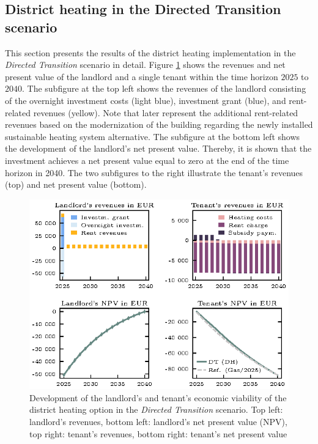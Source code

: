 \subsection{District heating in the Directed Transition scenario}\label{res:district_heating}
This section presents the results of the district heating implementation in the \textit{Directed Transition} scenario in detail. Figure \ref{fig:dt+dh} shows the revenues and net present value of the landlord and a single tenant within the time horizon $2025$ to $2040$. The subfigure at the top left shows the revenues of the landlord consisting of the overnight investment costs (light blue), investment grant (blue), and rent-related revenues (yellow). Note that later represent the additional rent-related revenues based on the modernization of the building regarding the newly installed sustainable heating system alternative. The subfigure at the bottom left shows the development of the landlord's net present value. Thereby, it is shown that the investment achieves a net present value equal to zero at the end of the time horizon in 2040. The two subfigures to the right illustrate the tenant's revenues (top) and net present value (bottom). 

\begin{figure}[h]
	\centering
	\includegraphics[width=1\linewidth]{figures/4_Results/fig_DT_DH/detail.eps}
	\caption{Development of the landlord's and tenant's economic viability of the district heating option in the \textit{Directed Transition} scenario. Top left: landlord's revenues, bottom left: landlord's net present value (NPV), top right: tenant's revenues, bottom right: tenant's net present value}
	\label{fig:dt+dh}
\end{figure}

